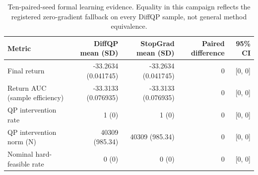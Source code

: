 \begin{table}[!t]
\centering\scriptsize
\caption{Ten-paired-seed formal learning evidence. Equality in this campaign reflects the registered zero-gradient fallback on every DiffQP sample, not general method equivalence.}
\label{tab:final-learning-evidence}
\begin{tabular}{lrrrr}
\toprule
Metric & DiffQP mean (SD) & StopGrad mean (SD) & Paired difference & 95\% CI \\
\midrule
Final return & -33.2634 (0.041745) & -33.2634 (0.041745) & 0 & [0, 0] \\
Return AUC (sample efficiency) & -33.3133 (0.076935) & -33.3133 (0.076935) & 0 & [0, 0] \\
QP intervention rate & 1 (0) & 1 (0) & 0 & [0, 0] \\
QP intervention norm (N) & 40309 (985.34) & 40309 (985.34) & 0 & [0, 0] \\
Nominal hard-feasible rate & 0 (0) & 0 (0) & 0 & [0, 0] \\
\bottomrule
\end{tabular}
\end{table}

